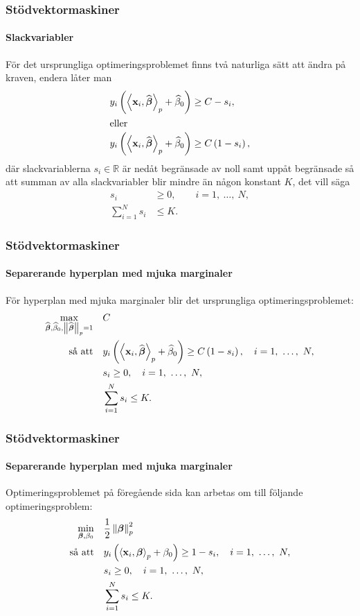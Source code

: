 \documentclass{beamer}
\theoremstyle{definition}
\theoremstyle{remark}
\newcommand{\bfbeta}{{\boldsymbol{\beta}}}
\newcommand{\bfx}{\mathbf{x}}
\newcommand{\llangle}{\left\langle}
\newcommand{\rrangle}{\right\rangle}
\newcommand{\inner}[2]{\llangle #1, #2 \rrangle}
\begin{document}
\begin{frame}
\frametitle{Stödvektormaskiner}
\framesubtitle{Slackvariabler}
	För det ursprungliga optimeringsproblemet finns två naturliga sätt att ändra på kraven, endera låter man
	\begin{align}
	y_i\left(\inner{\bfx_i}{\widehat{\bfbeta}}_p+\widehat{\beta}_0\right) &\geq C-s_i,\label{eq:softändring1}\\
	\intertext{eller}
	y_i\left(\inner{\bfx_i}{\widehat{\bfbeta}}_p+\widehat{\beta}_0\right) &\geq C\left(1-s_i\right),\label{eq:softändring2}
	\end{align}
	där slackvariablerna $s_i\in\mathbb{R}$ är nedåt begränsade av noll samt uppåt begränsade så att summan av alla slackvariabler blir mindre än någon konstant $K$, det vill säga \begin{equation*}
	\begin{aligned}
	s_i&\geq0,\qquad i=1,~\dots,~N,\\
	\sum_{i=1}^{N}s_i&\leq K.
	\end{aligned}
	\end{equation*}
\end{frame}

\begin{frame}
\frametitle{Stödvektormaskiner}
\framesubtitle{Separerande hyperplan med mjuka marginaler}
För hyperplan med mjuka marginaler blir det ursprungliga optimeringsproblemet:
\begin{equation*}\label{opt:softmargin}
\begin{aligned}
\operatornamewithlimits{max}_{\widehat{\bfbeta}, \widehat{\beta}_0, \left\|\widehat{\bfbeta}
	\right\|_p=1}& & &C\\
\text{så att}& & &y_i\left(\inner{\bfx_i}{\widehat{\bfbeta}}_p+\widehat{\beta}_0\right)\geq C\left(1-s_i\right),\quad i=1,~\dots,~N,\\
& & &s_i\geq0,\quad i=1,~\dots,~N,\\
& & &\sum_{i=1}^{N}s_i \leq K.
\end{aligned}
\end{equation*}
\end{frame}

\begin{frame}
\frametitle{Stödvektormaskiner}
\framesubtitle{Separerande hyperplan med mjuka marginaler}
Optimeringsproblemet på föregående sida kan arbetas om till följande optimeringsproblem:
\begin{equation*}
\begin{aligned}
\operatornamewithlimits{min}_{\bfbeta, \beta_0} & & &\frac{1}{2}\left\|\bfbeta
\right\|_p^2\\
\text{så att} & & &y_i\left(\inner{\bfx_i}{\bfbeta}_p+\beta_0\right)\geq 1 - s_i,\quad i=1,~\dots,~N,\\
& & &s_i\geq0,\quad i=1,~\dots,~N,\\
& & &\sum_{i=1}^{N} s_i \leq K.
\end{aligned}
\end{equation*}

\end{frame}
\end{document}

